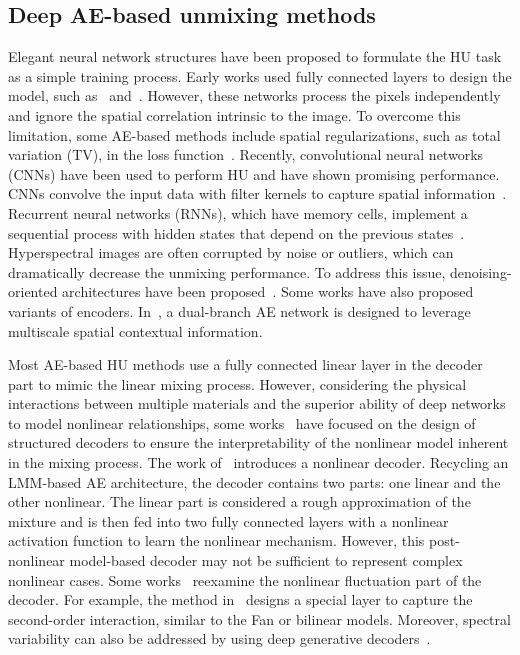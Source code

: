 \documentclass[journal,a4paper]{IEEEtran}
\begin{document}
\subsection{Deep AE-based unmixing methods}
Elegant neural network structures have been proposed to formulate the HU task as a simple training process. Early works used fully connected layers to design the model, such as~\cite{ozkan2018endnet} and~\cite{qu2018udas}. However, these networks process the pixels independently and ignore the spatial correlation intrinsic to the image.  To overcome this limitation, some AE-based methods include spatial regularizations, such as total variation (TV), in the loss function~\cite{zhao2021lstm}. Recently, convolutional neural networks (CNNs) have been used to perform HU and have shown promising performance. CNNs convolve the input data with filter kernels to capture spatial information~\cite{palsson2020convolutional,zhao2021hyperspectral}.  Recurrent neural networks (RNNs), which have memory cells, implement a sequential process with hidden states that depend on the previous states~\cite{zhao2021lstm}. Hyperspectral images are often corrupted by noise or outliers, which can dramatically decrease the unmixing performance. To address this issue, denoising-oriented architectures have been proposed~\cite{qu2018udas}.  Some works have also proposed variants of encoders. In~\cite{hua2021dual}, a dual-branch AE network is designed to leverage multiscale spatial contextual information.

Most AE-based HU methods use a fully connected linear layer in the decoder part to mimic the linear mixing process. However, considering the physical interactions between multiple materials and the superior ability of deep networks to model nonlinear relationships, some works~\cite{NAE2019,zhao2021hyperspectral,zhao2021lstm,shahid2021unsupervised} have focused on the design of structured decoders to ensure the interpretability of the nonlinear model inherent in the mixing process.  The work of~\cite{NAE2019} introduces a nonlinear decoder. Recycling an LMM-based AE architecture, the decoder contains two parts: one linear and the other nonlinear. The linear part is considered a rough approximation of the mixture and is then fed into two fully connected layers with a nonlinear activation function to learn the nonlinear mechanism. However, this post-nonlinear model-based decoder may not be sufficient to represent complex nonlinear cases.  Some works~\cite{zhao2021hyperspectral,zhao2021lstm,shahid2021unsupervised} reexamine the nonlinear fluctuation part of the decoder. For example, the method in~\cite{shahid2021unsupervised} designs a special layer to capture the second-order interaction, similar to the Fan or bilinear models. Moreover, spectral variability can also be addressed by using deep generative decoders~\cite{borsoi2019deep,shi2021probabilistic}.
\end{document}

